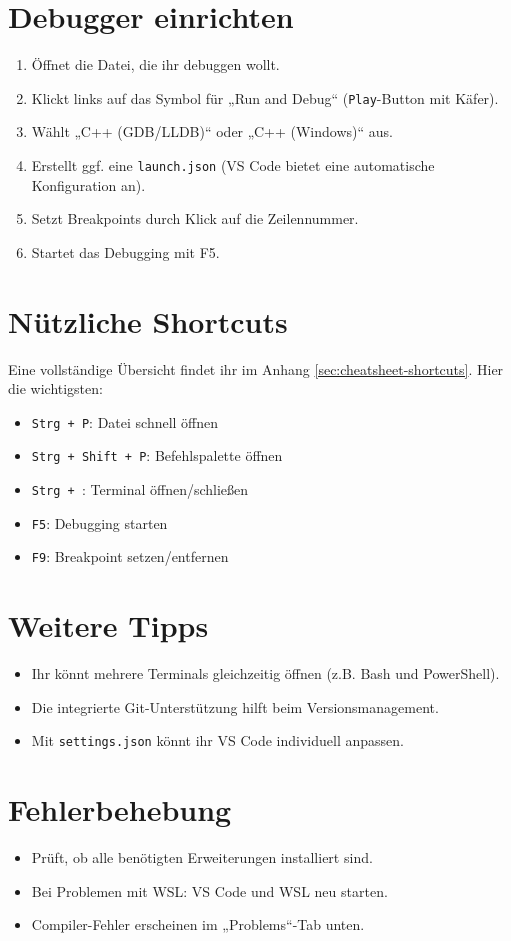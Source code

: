 \section{Debugger einrichten}
\begin{enumerate}
    \item Öffnet die Datei, die ihr debuggen wollt.
    \item Klickt links auf das Symbol für „Run and Debug“ (\texttt{Play}-Button mit Käfer).
    \item Wählt „C++ (GDB/LLDB)“ oder „C++ (Windows)“ aus.
    \item Erstellt ggf. eine \texttt{launch.json} (VS Code bietet eine automatische Konfiguration an).
    \item Setzt Breakpoints durch Klick auf die Zeilennummer.
    \item Startet das Debugging mit F5.
\end{enumerate}

\section{Nützliche Shortcuts}
Eine vollständige Übersicht findet ihr im Anhang \ref{sec:cheatsheet-shortcuts}. Hier die wichtigsten:
\begin{itemize}
    \item \texttt{Strg + P}: Datei schnell öffnen
    \item \texttt{Strg + Shift + P}: Befehlspalette öffnen
    \item \texttt{Strg + \textasciigrave}: Terminal öffnen/schließen
    \item \texttt{F5}: Debugging starten
    \item \texttt{F9}: Breakpoint setzen/entfernen
\end{itemize}

\section{Weitere Tipps}
\begin{itemize}
    \item Ihr könnt mehrere Terminals gleichzeitig öffnen (z.B. Bash und PowerShell).
    \item Die integrierte Git-Unterstützung hilft beim Versionsmanagement.
    \item Mit \texttt{settings.json} könnt ihr VS Code individuell anpassen.
\end{itemize}

\section{Fehlerbehebung}
\begin{itemize}
    \item Prüft, ob alle benötigten Erweiterungen installiert sind.
    \item Bei Problemen mit WSL: VS Code und WSL neu starten.
    \item Compiler-Fehler erscheinen im „Problems“-Tab unten.
\end{itemize}